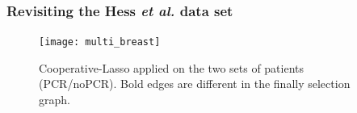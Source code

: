 % 
% 

\begin{frame}
  \frametitle{Revisiting the Hess \textit{et al.} data set}
  
  \begin{figure}
    \centering
    \texttt{[image: multi\_breast]}
    \caption{Cooperative-Lasso applied on the  two sets of patients
      (PCR/noPCR). Bold edges are different in the finally selection graph.} 
  \end{figure}

\end{frame}
